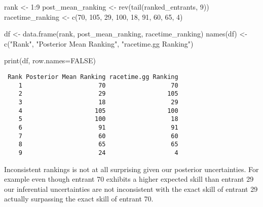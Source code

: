 \documentclass[
  letterpaper,
  DIV=11,
  numbers=noendperiod]{scrartcl}
\newenvironment{Shaded}{\begin{snugshade}}{\end{snugshade}}
\newcommand{\AttributeTok}[1]{\textcolor[rgb]{0.40,0.45,0.13}{#1}}
\newcommand{\ConstantTok}[1]{\textcolor[rgb]{0.56,0.35,0.01}{#1}}
\newcommand{\DecValTok}[1]{\textcolor[rgb]{0.68,0.00,0.00}{#1}}
\newcommand{\FunctionTok}[1]{\textcolor[rgb]{0.28,0.35,0.67}{#1}}
\newcommand{\NormalTok}[1]{\textcolor[rgb]{0.00,0.23,0.31}{#1}}
\newcommand{\OtherTok}[1]{\textcolor[rgb]{0.00,0.23,0.31}{#1}}
\newcommand{\SpecialCharTok}[1]{\textcolor[rgb]{0.37,0.37,0.37}{#1}}
\newcommand{\StringTok}[1]{\textcolor[rgb]{0.13,0.47,0.30}{#1}}
\begin{document}
\begin{Shaded}
\begin{Highlighting}[]
\NormalTok{rank }\OtherTok{\textless{}{-}} \DecValTok{1}\SpecialCharTok{:}\DecValTok{9}
\NormalTok{post\_mean\_ranking }\OtherTok{\textless{}{-}} \FunctionTok{rev}\NormalTok{(}\FunctionTok{tail}\NormalTok{(ranked\_entrants, }\DecValTok{9}\NormalTok{))}
\NormalTok{racetime\_ranking }\OtherTok{\textless{}{-}} \FunctionTok{c}\NormalTok{(}\DecValTok{70}\NormalTok{, }\DecValTok{105}\NormalTok{, }\DecValTok{29}\NormalTok{, }\DecValTok{100}\NormalTok{, }\DecValTok{18}\NormalTok{, }\DecValTok{91}\NormalTok{, }\DecValTok{60}\NormalTok{, }\DecValTok{65}\NormalTok{, }\DecValTok{4}\NormalTok{)}

\NormalTok{df }\OtherTok{\textless{}{-}} \FunctionTok{data.frame}\NormalTok{(rank, post\_mean\_ranking, racetime\_ranking)}
\FunctionTok{names}\NormalTok{(df) }\OtherTok{\textless{}{-}} \FunctionTok{c}\NormalTok{(}\StringTok{"Rank"}\NormalTok{, }\StringTok{"Posterior Mean Ranking"}\NormalTok{, }\StringTok{"racetime.gg Ranking"}\NormalTok{)}

\FunctionTok{print}\NormalTok{(df, }\AttributeTok{row.names=}\ConstantTok{FALSE}\NormalTok{)}
\end{Highlighting}
\end{Shaded}

\begin{verbatim}
 Rank Posterior Mean Ranking racetime.gg Ranking
    1                     70                  70
    2                     29                 105
    3                     18                  29
    4                    105                 100
    5                    100                  18
    6                     91                  91
    7                     60                  60
    8                     65                  65
    9                     24                   4
\end{verbatim}

Inconsistent rankings is not at all surprising given our posterior
uncertainties. For example even though entrant 70 exhibits a higher
expected skill than entrant 29 our inferential uncertainties are not
inconsistent with the exact skill of entrant 29 actually surpassing the
exact skill of entrant 70.
\end{document}
